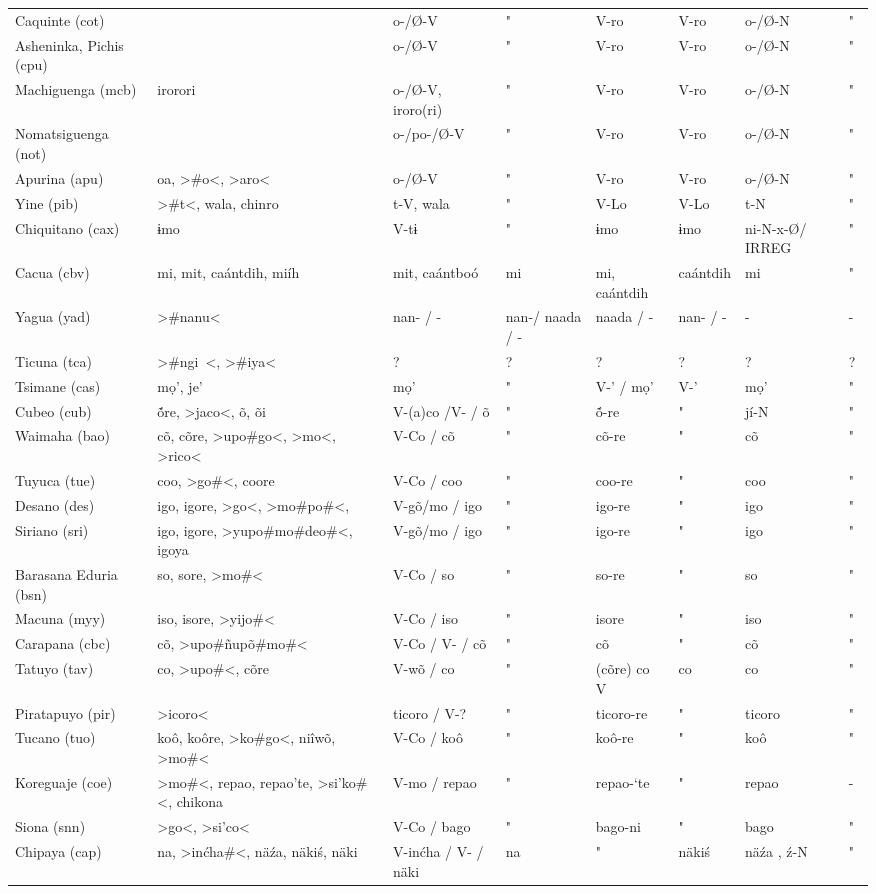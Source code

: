 \begin{landscape}
\begin{longtable}{*{8}{l}}
Caquinte (cot)	&		&	o-/Ø-V	&	"	&	V-ro	&	V-ro	&	o-/Ø-N	&	"	\\
Asheninka, Pichis (cpu)	&		&	o-/Ø-V	&	"	&	V-ro	&	V-ro	&	o-/Ø-N	&	"	\\
Machiguenga (mcb)	&	irorori	&	o-/Ø-V, iroro(ri)	&	"	&	V-ro	&	V-ro	&	o-/Ø-N	&	"	\\
Nomatsiguenga (not)	&		&	o-/po-/Ø-V	&	"	&	V-ro	&	V-ro	&	o-/Ø-N	&	"	\\
Apurina (apu)	&	oa, >\#o<, >aro<	&	o-/Ø-V	&	"	&	V-ro	&	V-ro	&	o-/Ø-N	&	"	\\
Yine (pib)	&	>\#t<, wala, {chinro}	&	t-V, wala	&	" 	&	V-Lo	&	V-Lo	&	 t-N	&	" 	\\
Chiquitano (cax)	&	ɨmo	&	V-tɨ	&	" 	&	ɨmo	&	ɨmo 	&	ni-N-x-Ø/ IRREG	&	" 	\\
Cacua (cbv)	&	mi, mit, caántdih, miíh	&	mit, caántboó 	&	mi	&	mi, caántdih 	&	caántdih 	&	mi	&	" 	\\
Yagua (yad)	&	>\#nanu<	&	nan- / -	&	nan-/ naada / -	&	naada / -	&	nan- / -	&	 -	&	-	\\
Ticuna (tca)	&	>\#ngi~<, >\#iya<	&	?	&	?	&	?	&	?	&	?	&	?	\\
Tsimane (cas)	&	mọ’, {je'}	&	mọ’	&	"	&	V-’ / mọ’	&	V-’	&	mọ’	&	"	\\
Cubeo (cub)	&	ṍre, >jaco<, õ, õi	&	V-(a)co /V- / õ	&	"	&	ṍ-re 	&	"	&	jí-N	&	"	\\
Waimaha (bao)	&	cõ, cõre, >upo\#<, >go<, >mo<, {>rico<}	&	V-Co / cõ	&	"	&	cõ-re 	&	"	&	cõ	&	"	\\
Tuyuca (tue)	&	coo, >go\#<, coore	&	V-Co / coo	&	"	&	coo-re 	&	"	&	coo	&	"	\\
Desano (des)	&	igo, igore, >go<, >mo\#<, >po\#<, 	&	V-gõ/mo / igo	&	"	&	igo-re 	&	"	&	igo	&	"	\\
Siriano (sri)	&	igo, igore, >yupo\#<, >mo\#<, >deo\#<, {igoya}	&	V-gõ/mo / igo	&	"	&	igo-re 	&	"	&	igo	&	"	\\
Barasana Eduria (bsn)	&	so, sore, >mo\#<	&	V-Co / so	&	"	&	so-re	&	"	&	so	&	"	\\
Macuna (myy)	&	iso, isore, >yijo\#<	&	V-Co / iso	&	"	&	isore 	&	"	&	iso	&	"	\\
Carapana (cbc)	&	cõ, >upo\#<, >ñupõ\#<, >mo\#<	&	V-Co / V- / cõ	&	"	&	cõ	&	"	&	cõ	&	"	\\
Tatuyo (tav)	&	co, >upo\#<, cõre	&	V-wõ / co	&	"	&	(cõre) co V	&	co	&	co	&	"	\\
Piratapuyo (pir)	&	>icoro<	&	ticoro / V-?	&	"	&	ticoro-re	&	"	&	ticoro	&	"	\\
Tucano (tuo)	&	koô, koôre, >ko\#<, >go<, niîwõ, >mo\#<	&	V-Co / koô	&	"	&	koô-re	&	"	&	koô 	&	"	\\
Koreguaje (coe)	&	>mo\#<, repao, repao'te, >si'ko\#<, {chikona}	&	V-mo / repao 	&	"	&	repao-‘te 	&	"	&	repao	&	 -	\\
Siona (snn)	&	>go<, {>si'co<}	&	V-Co / bago	&	"	&	bago-ni	&	"	&	bago 	&	"	\\
Chipaya (cap)	&	na, >inćha\#<, näźa, {näkiś, näki}	&	V-inćha / V- / näki	&	na	&	"	&	näkiś 	&	näźa , ź-N	&	"	\\
\end{longtable}
\end{landscape}



